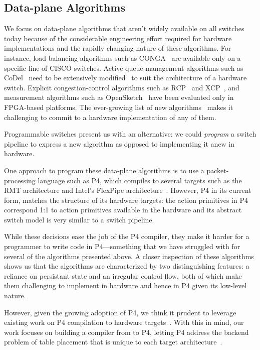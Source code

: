 \subsection{Data-plane Algorithms}
\label{ss:data-plane}
 We focus on data-plane algorithms that aren't widely available on all switches
today because of the considerable engineering effort required for hardware
implementations and the rapidly changing nature of these algorithms. For
instance, load-balancing algorithms such as CONGA~\cite{conga} are available
only on a specific line of CISCO switches.  Active queue-management algorithms
such as CoDel~\cite{codel} need to be extensively modified~\cite{pie} to suit
the architecture of a hardware switch.  Explicit congestion-control algorithms
such as RCP~\cite{rcp} and XCP~\cite{xcp}, and measurement algorithms such as
OpenSketch~\cite{opensketch} have been evaluated only in FPGA-based platforms.
The ever-growing list of new algorithms~\cite{pdq, d3, detail} makes it
challenging to commit to a hardware implementation of any of them.

 Programmable switches present us with an alternative: we could
\textit{program} a switch pipeline to express a new algorithm as opposed to
implementing it anew in hardware.

One approach to program these data-plane algorithms is to use a
packet-processing language such as P4, which compiles to several targets such
as the RMT architecture and Intel's FlexPipe
architecture~\cite{lavanya_compiler}. However, P4 in its current form, matches
the structure of its hardware targets: the action primitives in P4 correspond
1:1 to action primitives available in the hardware and its abstract switch
model is very similar to a switch pipeline.

While these decisions ease the job of the P4 compiler, they make it harder for
a programmer to write code in P4---something that we have struggled with for
several of the algorithms presented above. A closer inspection of these
algorithms shows us that the algorithms are characterized by two distinguishing
features: a reliance on persistant state and an irregular control flow, both of
which make them challenging to implement in hardware and hence in P4 given its
low-level nature.

However, given the growing adoption of P4, we think it prudent to leverage
existing work on P4 compilation to hardware targets~\cite{netronome, xilinx}.
With this in mind, our work focuses on building a compiler from \pktlanguage to
P4, letting P4 address the backend problem of table placement that is unique to
each target architecture~\cite{lavanya_compiler}.

